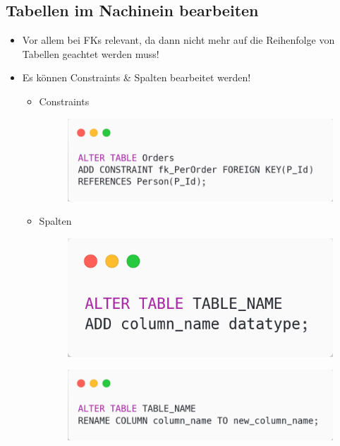 \subsection{Tabellen im Nachinein bearbeiten}
\begin{itemize}
    \item Vor allem bei FKs relevant, da dann nicht mehr auf die Reihenfolge von Tabellen geachtet werden muss!
    \item Es können Constraints \& Spalten bearbeitet werden!
    \begin{itemize}
        \item Constraints
        \begin{figure}[H]
            \centering
            \includegraphics[scale=.3]{res/themenkorb_3/alter_constraint.png}
        \end{figure}
        \item Spalten
        \begin{figure}[H]
            \centering
            \includegraphics[scale=.3]{res/themenkorb_3/add_col.png}
        \end{figure}
        \begin{figure}[H]
            \centering
            \includegraphics[scale=.3]{res/themenkorb_3/rename_col.png}

\end{figure}
\end{itemize}
\end{itemize}
